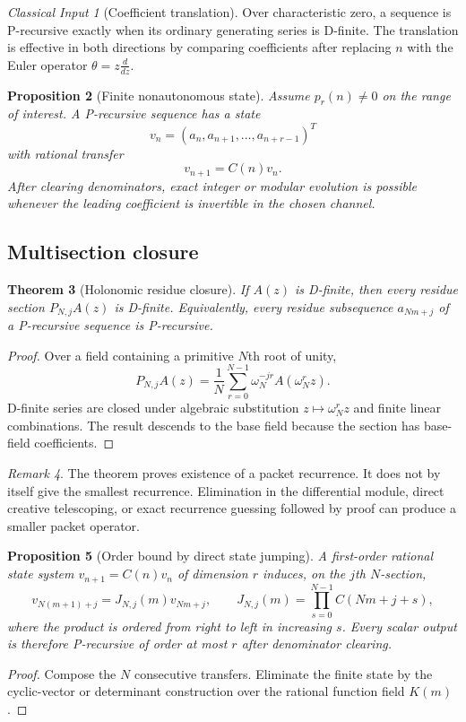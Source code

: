 \documentclass[11pt]{article}
\newtheorem{theorem}{Theorem}[section]\newtheorem{proposition}[theorem]{Proposition}\newtheorem{lemma}[theorem]{Lemma}\newtheorem{corollary}[theorem]{Corollary}
\theoremstyle{definition}\newtheorem{definition}[theorem]{Definition}\newtheorem{example}[theorem]{Example}\newtheorem{construction}[theorem]{Construction}\newtheorem{algorithm}[theorem]{Algorithm}\newtheorem{conjecture}[theorem]{Conjecture}\newtheorem{problem}[theorem]{Problem}
\theoremstyle{remark}\newtheorem{remark}[theorem]{Remark}\newtheorem{boundary}[theorem]{Boundary}\newtheorem{certificate}[theorem]{Computational Certificate}\newtheorem{classical}[theorem]{Classical Input}\newtheorem{principle}[theorem]{Structural Principle}
\begin{document}
\begin{classical}[Coefficient translation]
Over characteristic zero, a sequence is P-recursive exactly when its ordinary generating series is D-finite.  The translation is effective in both directions by comparing coefficients after replacing $n$ with the Euler operator $\theta=z\frac{d}{dz}$.
\end{classical}

\begin{proposition}[Finite nonautonomous state]
Assume $p_r(n)\neq0$ on the range of interest.  A P-recursive sequence has a state
\[
 v_n=(a_n,a_{n+1},\ldots,a_{n+r-1})^T
\]
with rational transfer
\[
 v_{n+1}=C(n)v_n.
\]
After clearing denominators, exact integer or modular evolution is possible whenever the leading coefficient is invertible in the chosen channel.
\end{proposition}

\subsection{Multisection closure}
\begin{theorem}[Holonomic residue closure]
If $A(z)$ is D-finite, then every residue section $P_{N,j}A(z)$ is D-finite.  Equivalently, every residue subsequence $a_{Nm+j}$ of a P-recursive sequence is P-recursive.
\end{theorem}
\begin{proof}
Over a field containing a primitive $N$th root of unity,
\[
 P_{N,j}A(z)=\frac1N\sum_{r=0}^{N-1}\omega_N^{-jr}A(\omega_N^rz).
\]
D-finite series are closed under algebraic substitution $z\mapsto\omega_N^rz$ and finite linear combinations.  The result descends to the base field because the section has base-field coefficients.
\end{proof}

\begin{remark}
The theorem proves existence of a packet recurrence.  It does not by itself give the smallest recurrence.  Elimination in the differential module, direct creative telescoping, or exact recurrence guessing followed by proof can produce a smaller packet operator.
\end{remark}

\begin{proposition}[Order bound by direct state jumping]
A first-order rational state system $v_{n+1}=C(n)v_n$ of dimension $r$ induces, on the $j$th $N$-section,
\[
 v_{N(m+1)+j}=J_{N,j}(m)v_{Nm+j},
\qquad
 J_{N,j}(m)=\prod_{s=0}^{N-1}C(Nm+j+s),
\]
where the product is ordered from right to left in increasing $s$.  Every scalar output is therefore P-recursive of order at most $r$ after denominator clearing.
\end{proposition}
\begin{proof}
Compose the $N$ consecutive transfers.  Eliminate the finite state by the cyclic-vector or determinant construction over the rational function field $K(m)$.
\end{proof}
\end{document}
